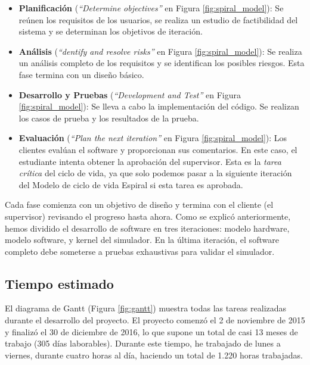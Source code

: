 \begin{itemize}
\item \textbf{Planificación} (\emph{``Determine objectives''} en Figura \ref{fig:spiral_model}): Se reúnen los requisitos de los usuarios, se realiza un estudio de factibilidad del sistema y se determinan los objetivos de iteración.

\item \textbf{Análisis} (\emph{``dentify and resolve risks''} en Figura \ref{fig:spiral_model}): Se realiza un análisis completo de los requisitos y se identifican los posibles riesgos. Esta fase termina con un diseño básico.

\item \textbf{Desarrollo y Pruebas} (\emph{``Development and Test''} en Figura \ref{fig:spiral_model}): Se lleva a cabo la implementación del código. Se realizan los casos de prueba y los resultados de la prueba.

\item \textbf{Evaluación} (\emph{``Plan the next iteration''} en Figura \ref{fig:spiral_model}): 
Los clientes evalúan el software y proporcionan sus comentarios. En este caso, el estudiante intenta obtener la aprobación del supervisor. Esta es la \textit{tarea crítica} del ciclo de vida, ya que solo podemos pasar a la siguiente iteración del Modelo de ciclo de vida Espiral si esta tarea es aprobada.

\end{itemize}

Cada fase comienza con un objetivo de diseño y termina con el cliente (el supervisor) revisando el progreso hasta ahora. Como se explicó anteriormente, hemos dividido el desarrollo de software en tres iteraciones: modelo hardware, modelo software, y kernel del simulador. En la última iteración, el software completo debe someterse a pruebas exhaustivas para validar el simulador.

\subsection{Tiempo estimado}

El diagrama de Gantt (Figura \ref{fig:gantt}) muestra todas las tareas realizadas durante el desarrollo del proyecto. El proyecto comenzó el 2 de noviembre de 2015 y finalizó el 30 de diciembre de 2016, lo que supone un total de casi 13 meses de trabajo (305 días laborables). Durante este tiempo, he trabajado de lunes a viernes, durante cuatro horas al día, haciendo un total de 1.220 horas trabajadas.

